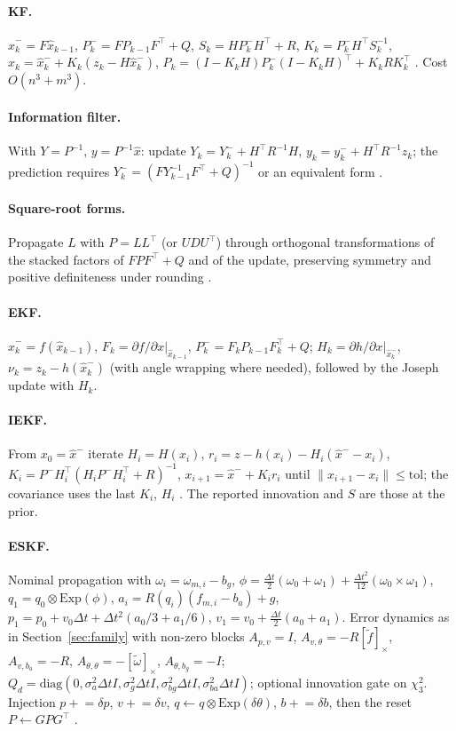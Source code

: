 \documentclass[11pt,a4paper]{article}
\newcommand{\tp}{^{\top}}
\begin{document}
\paragraph{KF.} $\hat x^-_k=F\hat x_{k-1}$, $P^-_k=FP_{k-1}F\tp+Q$, $S_k=HP^-_kH\tp+R$,
$K_k=P^-_kH\tp S_k^{-1}$, $\hat x_k=\hat x^-_k+K_k(z_k-H\hat x^-_k)$,
$P_k=(I-K_kH)P^-_k(I-K_kH)\tp+K_kRK_k\tp$ \citep{kalman1960}. Cost $O(n^3+m^3)$.

\paragraph{Information filter.} With $Y=P^{-1}$, $y=P^{-1}\hat x$: update
$Y_k=Y^-_k+H\tp R^{-1}H$, $y_k=y^-_k+H\tp R^{-1}z_k$; the prediction requires
$Y^-_k=(FY_{k-1}^{-1}F\tp+Q)^{-1}$ or an equivalent form \citep{barshalom2001}.

\paragraph{Square-root forms.} Propagate $L$ with $P=LL\tp$ (or $UDU\tp$) through orthogonal
transformations of the stacked factors of $FPF\tp+Q$ and of the update, preserving symmetry and
positive definiteness under rounding \citep{bierman1977}.

\paragraph{EKF.} $\hat x^-_k=f(\hat x_{k-1})$, $F_k=\partial f/\partial x|_{\hat x_{k-1}}$,
$P^-_k=F_kP_{k-1}F_k\tp+Q$; $H_k=\partial h/\partial x|_{\hat x^-_k}$, $\nu_k=z_k-h(\hat x^-_k)$ (with
angle wrapping where needed), followed by the Joseph update with $H_k$.

\paragraph{IEKF.} From $x_0=\hat x^-$ iterate $H_i=H(x_i)$,
$r_i=z-h(x_i)-H_i(\hat x^--x_i)$, $K_i=P^-H_i\tp(H_iP^-H_i\tp+R)^{-1}$, $x_{i+1}=\hat x^-+K_ir_i$ until
$\|x_{i+1}-x_i\|\le\mathrm{tol}$; the covariance uses the last $K_i$, $H_i$ \citep{bell1993}. The
reported innovation and $S$ are those at the prior.

\paragraph{ESKF.} Nominal propagation with $\omega_i=\omega_{m,i}-b_g$,
$\phi=\tfrac{\Delta t}{2}(\omega_0+\omega_1)+\tfrac{\Delta t^2}{12}(\omega_0\times\omega_1)$,
$q_1=q_0\otimes\mathrm{Exp}(\phi)$, $a_i=R(q_i)(f_{m,i}-b_a)+g$,
$p_1=p_0+v_0\Delta t+\Delta t^2(a_0/3+a_1/6)$, $v_1=v_0+\tfrac{\Delta t}{2}(a_0+a_1)$. Error dynamics
as in Section~\ref{sec:family} with non-zero blocks $A_{p,v}=I$, $A_{v,\theta}=-R[\tilde f]_\times$,
$A_{v,b_a}=-R$, $A_{\theta,\theta}=-[\tilde\omega]_\times$, $A_{\theta,b_g}=-I$;
$Q_d=\mathrm{diag}(0,\sigma_a^2\Delta t I,\sigma_g^2\Delta t I,\sigma_{bg}^2\Delta t I,\sigma_{ba}^2\Delta t I)$;
optional innovation gate on $\chi^2_3$. Injection $p\mathrel{+}=\delta p$, $v\mathrel{+}=\delta v$,
$q\leftarrow q\otimes\mathrm{Exp}(\delta\theta)$, $b\mathrel{+}=\delta b$, then the reset
$P\leftarrow GPG\tp$ \citep{sola2017}.
\end{document}
